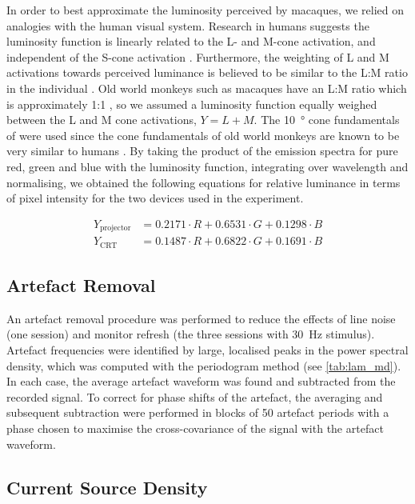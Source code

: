 In order to best approximate the luminosity perceived by macaques, we relied on analogies with the human visual system.
Research in humans suggests the luminosity function is linearly related to the L- and M-cone activation, and independent of the S-cone activation \citep{Stockman2008}.
Furthermore, the weighting of L and M activations towards perceived luminance is believed to be similar to the L:M ratio in the individual \citep{Stockman2008}.
Old world monkeys such as macaques have an L:M ratio which is approximately 1:1 \citep{Dobkins2000}, so we assumed a luminosity function equally weighed between the L and M cone activations, $Y=L+M$.
The \SI{10}{\degree} cone fundamentals of \citet{Stockman2000} were used since the cone fundamentals of old world monkeys are known to be very similar to humans \citep{Dobkins2000}.
By taking the product of the emission spectra for pure red, green and blue with the luminosity function, integrating over wavelength and normalising, we obtained the following equations for relative luminance in terms of pixel intensity for the two devices used in the experiment.

\begin{align}
    Y_{\text{projector}} &= 0.2171 \cdot R + 0.6531 \cdot G + 0.1298 \cdot B\\
    Y_{\text{CRT}}       &= 0.1487 \cdot R + 0.6822 \cdot G + 0.1691 \cdot B
\end{align}


\subsection{Artefact Removal}
\label{sec:lam_artefact}

An artefact removal procedure was performed to reduce the effects of line noise (one session) and monitor refresh (the three sessions with \SI{30}{Hz} stimulus).
Artefact frequencies were identified by large, localised peaks in the power spectral density, which was computed with the periodogram method (see \autoref{tab:lam_md}).
In each case, the average artefact waveform was found and subtracted from the recorded signal.
To correct for phase shifts of the artefact, the averaging and subsequent subtraction were performed in blocks of 50 artefact periods with a phase chosen to maximise the cross-covariance of the signal with the artefact waveform.


\subsection{Current Source Density}

